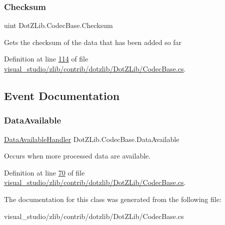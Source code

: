 \subsubsection{\texorpdfstring{Checksum}{Checksum}}
{\footnotesize\ttfamily uint Dot\+Z\+Lib.\+Codec\+Base.\+Checksum\hspace{0.3cm}{\ttfamily [get]}}



Gets the checksum of the data that has been added so far 



Definition at line \hyperlink{visual__studio_2zlib_2contrib_2dotzlib_2_dot_z_lib_2_codec_base_8cs_source_l00114}{114} of file \hyperlink{visual__studio_2zlib_2contrib_2dotzlib_2_dot_z_lib_2_codec_base_8cs_source}{visual\+\_\+studio/zlib/contrib/dotzlib/\+Dot\+Z\+Lib/\+Codec\+Base.\+cs}.



\subsection{Event Documentation}
\mbox{\label{class_dot_z_lib_1_1_codec_base_ad7ec5a193ad07d7c91d2538c51eb33c1}} 
\subsubsection{\texorpdfstring{Data\+Available}{DataAvailable}}
{\footnotesize\ttfamily \hyperlink{namespace_dot_z_lib_a13a751b897fc2af0be2307e4deb7eb1c}{Data\+Available\+Handler} Dot\+Z\+Lib.\+Codec\+Base.\+Data\+Available}



Occurs when more processed data are available. 



Definition at line \hyperlink{visual__studio_2zlib_2contrib_2dotzlib_2_dot_z_lib_2_codec_base_8cs_source_l00070}{70} of file \hyperlink{visual__studio_2zlib_2contrib_2dotzlib_2_dot_z_lib_2_codec_base_8cs_source}{visual\+\_\+studio/zlib/contrib/dotzlib/\+Dot\+Z\+Lib/\+Codec\+Base.\+cs}.



The documentation for this class was generated from the following file\+:\begin{DoxyCompactItemize}
\item 
visual\+\_\+studio/zlib/contrib/dotzlib/\+Dot\+Z\+Lib/\+Codec\+Base.\+cs\end{DoxyCompactItemize}
